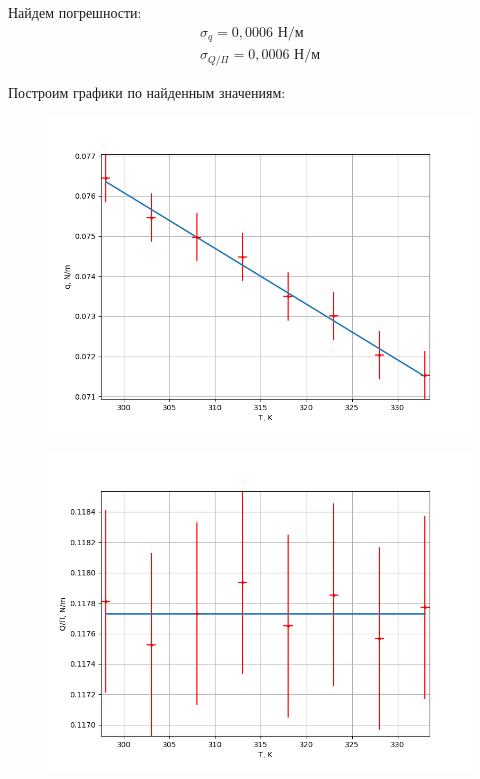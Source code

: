 \documentclass[12pt]{article}
\begin{document}
Найдем погрешности:
\begin{align*}
	\sigma_q = 0,0006 \text{ Н/м}\\
	\sigma_{Q/\Pi} = 0,0006 \text{ Н/м}
\end{align*}

Построим графики по найденным значениям:
\begin{figure}[H]
	\centering
	\includegraphics[scale=0.7]{./images/q.png}
\end{figure}

\begin{figure}[H]
	\centering
	\includegraphics[scale=0.7]{./images/Qp.png}
\end{figure}
\end{document}
